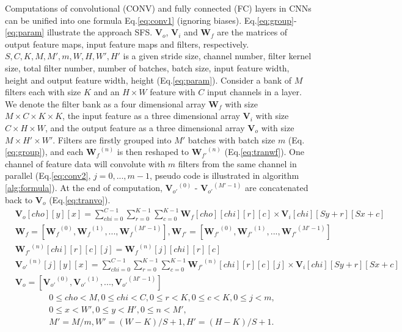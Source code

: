\documentclass{article} %
\begin{document}
Computations of convolutional (CONV) and fully connected (FC) layers in CNNs can be unified into one formula Eq.\ref{eq:conv1} (ignoring biases). Eq.\ref{eq:group}-\ref{eq:param} illustrate the approach SFS. ${\bm{V}_{o}}$, ${\bm{V}_{i}}$ and ${\bm{W}_{f}}$ are the matrices of output feature maps, input feature maps and filters, respectively. $S,C,K,M,M',m,W,H,W',H'$ is a given stride size, channel number, filter kernel size, total filter number, number of batches, batch size, input feature width, height and output feature width, height (Eq.\ref{eq:param}). Consider a bank of $M$ filters each with size $K$ and an $H\times W$ feature with $C$ input channels in a layer. We denote the filter bank as a four dimensional array ${\bm{W}_{f}}$ with size $M\times C \times K\times K$, the input feature as a three dimensional array ${\bm{V}_{i}}$ with size $C\times H\times W$, and the output feature as a three dimensional array ${\bm{V}_{o}}$ with size $M\times H'\times W'$. Filters are firstly grouped into $M'$ batches with batch size $m$ (Eq.\ref{eq:group}), and each ${\bm{W}_{f}}^{(n)}$ is then reshaped to ${\bm{W}_{f'}}^{(n)}$ (Eq.\ref{eq:tranwf}). One channel of feature data will convolute with $m$ filters from the same channel in parallel (Eq.\ref{eq:conv2}, $j=0,...,m-1$, pseudo code is illustrated in algorithm \ref{alg:formula}). At the end of computation, ${{\bm{V}_{o'}}^{(0)}}$ - ${{\bm{V}_{o'}}^{(M'-1)}}$ are concatenated back to ${{\bm{V}_{o}}}$ (Eq.\ref{eq:tranvo}).
\begin{align}
&{{\bm{V}_{o}}}[cho][y][x]=\sum\limits_{chi=0}^{C-1}{\sum\limits_{r=0}^{K-1}{\sum\limits_{c=0}^{K-1}{{{\bm{W}_{f}}}[cho][chi][r][c]\times {{\bm{V}_{i}}}[chi][Sy+r][Sx+c]}}} \label{eq:conv1} \\
&{{\bm{W}_{f}}}=[{{\bm{W}_{f}}^{(0)}},{{\bm{W}_{f}}^{(1)}},...,{{\bm{W}_{f}}^{(M'-1)}}], {{\bm{W}_{f'}}}=[{{\bm{W}_{f'}}^{(0)}},{{\bm{W}_{f'}}^{(1)}},...,{{\bm{W}_{f'}}^{(M'-1)}}]\label{eq:group}\\ &{{\bm{W}_{f'}}^{(n)}}[chi][r][c][j]={{\bm{W}_{f}}^{(n)}}[j][chi][r][c]\label{eq:tranwf} \\
&{{\bm{V}_{o'}}^{(n)}}[j][y][x]=\sum\limits_{chi=0}^{C-1}{\sum\limits_{r=0}^{K-1}{\sum\limits_{c=0}^{K-1}{{{\bm{W}_{f'}}^{(n)}}[chi][r][c][j]\times {{\bm{V}_{i}}}[chi][Sy+r][Sx+c]}}} \label{eq:conv2} \\
&{{\bm{V}_{o}}}=[{{\bm{V}_{o'}}^{(0)}},{{\bm{V}_{o'}}^{(1)}},...,{{\bm{V}_{o'}}^{(M'-1)}}]\label{eq:tranvo}
\end{align}
\begin{equation} \label{eq:param} \begin{aligned}
&0\le cho<M, 0\le chi<C, 0\le r<K, 0\le c<K, 0\le j<m,\\
&0\le x<W', 0\le y<H', 0\le n<M', \\
&M'=M/m, W'=(W-K)/S+1, H'=(H-K)/S+1.
\end{aligned} \end{equation}
\end{document}
